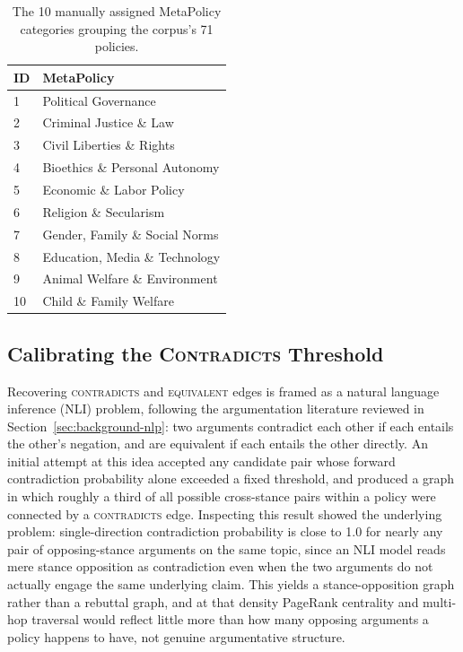 \begin{table}[htbp]
\centering
\caption{The 10 manually assigned MetaPolicy categories grouping the corpus's 71 policies.}
\label{tab:metapolicies}
\begin{tabular}{ll}
\toprule
\textbf{ID} & \textbf{MetaPolicy} \\
\midrule
1 & Political Governance \\
2 & Criminal Justice \& Law \\
3 & Civil Liberties \& Rights \\
4 & Bioethics \& Personal Autonomy \\
5 & Economic \& Labor Policy \\
6 & Religion \& Secularism \\
7 & Gender, Family \& Social Norms \\
8 & Education, Media \& Technology \\
9 & Animal Welfare \& Environment \\
10 & Child \& Family Welfare \\
\bottomrule
\end{tabular}
\end{table}

\subsection{Calibrating the \textsc{Contradicts} Threshold}
\label{sec:methodology-edges-calibration}

Recovering \textsc{contradicts} and \textsc{equivalent} edges is framed as a natural language
inference (NLI) problem, following the argumentation literature reviewed in
Section~\ref{sec:background-nlp}: two arguments contradict each other if each entails the
other's negation, and are equivalent if each entails the other directly. An initial attempt at
this idea accepted any candidate pair whose forward contradiction probability alone exceeded a
fixed threshold, and produced a graph in which roughly a third of all possible cross-stance pairs
within a policy were connected by a \textsc{contradicts} edge. Inspecting this result showed the
underlying problem: single-direction contradiction probability is close to 1.0 for nearly any
pair of opposing-stance arguments on the same topic, since an NLI model reads mere stance
opposition as contradiction even when the two arguments do not actually engage the same
underlying claim. This yields a stance-opposition graph rather than a rebuttal graph, and at that
density PageRank centrality and multi-hop traversal would reflect little more than how many
opposing arguments a policy happens to have, not genuine argumentative structure.

